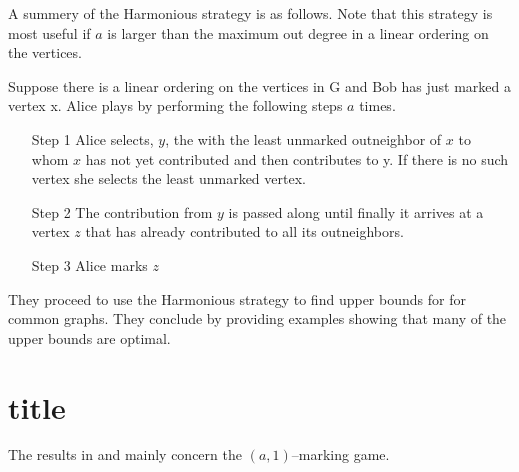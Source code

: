 \documentclass[11pt]{article}
\numberwithin{figure}{section}
\theoremstyle{definition}
\begin{document}
    A summery of the Harmonious strategy is as follows. Note that this strategy is most useful if $a$ is larger than the maximum out degree in a linear ordering on the vertices.
    
    Suppose there is a linear ordering on the vertices in G and Bob has just marked a vertex x. Alice plays by performing the following steps $a$ times.    
    \begin{itemize}
        \item [Step 1] Alice selects, $y$, the with the least unmarked outneighbor of $x$ to whom $x$ has not yet contributed and then contributes to y. If there is no such vertex she selects the least unmarked vertex.
        \item [Step 2] The contribution from $y$
         is passed along until finally it arrives at a vertex $z$ that has already
        contributed to all its outneighbors.
        \item [Step 3] Alice marks $z$
    \end{itemize}
    
    They proceed to use the Harmonious strategy to find upper bounds for for common graphs. They conclude by providing examples showing that many of the upper bounds are optimal.
    
    \section{title}
    The results in \cite{kierYang2005} and \cite{yangZhu2008} mainly concern the $(a,1)$--marking game.
    
    
    
\end{document}
